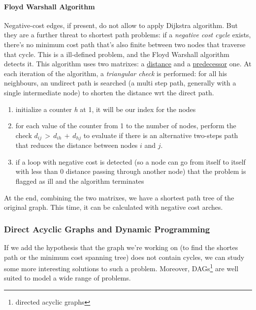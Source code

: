 \documentclass{article}
\begin{document}
			\paragraph{Floyd Warshall Algorithm}
				Negative-cost edges, if present, do not allow to apply Dijkstra algorithm. But they are a further threat to shortest path problems: if a \textit{negative cost cycle} exists, there's no minimum cost path that's also finite between two nodes that traverse that cycle. This is a ill-defined problem, and the Floyd Warshall algorithm detects it. This algorithm uses two matrixes: a \underline{distance} and a \underline{predecessor} one. At each iteration of the algorithm, a \textit{triangular check} is performed: for all his neighbours, an undirect path is searched (a multi step path, generally with a single intermediate node) to shorten the distance wrt the direct path.
				\begin{enumerate}
					\item initialize a counter \emph{h} at 1, it will be our index for the nodes
					\item for each value of the counter from 1 to the number of nodes, perform the check $d_{ij}\, >\, d_{ih}\, +\, d_{hj}$ to evaluate if there is an alternative two-steps path that reduces the distance between nodes $i$ and $j$.
					\item if a loop with negative cost is detected (so a node can go from itself to itself with less than 0 distance passing through another node) that the problem is flagged as ill and the algorithm terminates
				\end{enumerate}
				At the end, combining the two matrixes, we have a shortest path tree of the original graph. This time, it can be calculated with negative cost arches.

			\subsubsection{Direct Acyclic Graphs and Dynamic Programming}
				If we add the hypothesis that the graph we're working on (to find the shortes path or the minimum cost spanning tree) does not contain cycles, we can study some more interesting solutions to such a problem. Moreover, DAGs\footnote{directed acyclic graphs} are well suited to model a wide range of problems.
\end{document}
